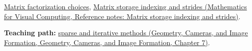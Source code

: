 \hyperref[appendix-221a483bec2d]{Matrix factorization choices}, \href{../02-Mathematics-for-Visual-Computing/main.pdf\#nameddest=appendix-ffdc1d4e5350}{Matrix storage indexing and strides (Mathematics for Visual Computing, Reference notes: Matrix storage indexing and strides)}.

\textbf{Teaching path:} \href{../03-Geometry-Cameras-and-Image-Formation/main.pdf\#nameddest=02-foundations-ii-ch038-sparse-problems-change-the-economics-of-solving}{sparse and iterative methods (Geometry, Cameras, and Image Formation, Geometry, Cameras, and Image Formation, Chapter 7)}.
